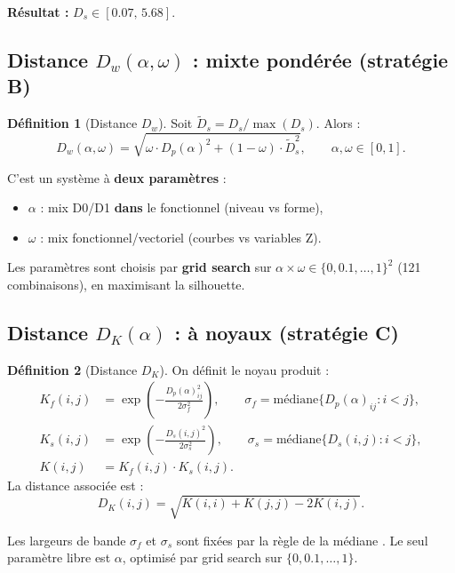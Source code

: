 \documentclass[11pt, a4paper]{article}
\newcommand{\Dp}{D_p}
\newcommand{\Dw}{D_w}
\newcommand{\DK}{D_K}
\theoremstyle{definition}
\newtheorem{definition}{Définition}[section]
\theoremstyle{remark}
\begin{document}
\textbf{Résultat :} $D_s \in [0.07, \, 5.68]$.

\subsection{Distance $\Dw(\alpha, \omega)$ : mixte pondérée (stratégie B)}

\begin{definition}[Distance $\Dw$]
Soit $\tilde{D}_s = D_s / \max(D_s)$. Alors :
\[
  \Dw(\alpha, \omega) = \sqrt{\omega \cdot \Dp(\alpha)^2 + (1-\omega) \cdot \tilde{D}_s^2},
  \qquad \alpha, \omega \in [0, 1].
\]
\end{definition}

C'est un système à \textbf{deux paramètres} :
\begin{itemize}[nosep]
  \item $\alpha$ : mix D0/D1 \textbf{dans} le fonctionnel (niveau vs forme),
  \item $\omega$ : mix fonctionnel/vectoriel (courbes vs variables Z).
\end{itemize}

Les paramètres sont choisis par \textbf{grid search} sur
$\alpha \times \omega \in \{0, 0.1, \ldots, 1\}^2$ (121 combinaisons),
en maximisant la silhouette.

\subsection{Distance $\DK(\alpha)$ : à noyaux (stratégie C)}

\begin{definition}[Distance $\DK$]
On définit le noyau produit :
\begin{align*}
  K_f(i,j) &= \exp\!\left(-\frac{\Dp(\alpha)_{ij}^2}{2\sigma_f^2}\right), \qquad
  \sigma_f = \text{médiane}\{\Dp(\alpha)_{ij} : i < j\}, \\
  K_s(i,j) &= \exp\!\left(-\frac{D_s(i,j)^2}{2\sigma_s^2}\right), \qquad
  \sigma_s = \text{médiane}\{D_s(i,j) : i < j\}, \\
  K(i,j) &= K_f(i,j) \cdot K_s(i,j).
\end{align*}
La distance associée est :
\[
  \DK(i,j) = \sqrt{K(i,i) + K(j,j) - 2K(i,j)}.
\]
\end{definition}

Les largeurs de bande $\sigma_f$ et $\sigma_s$ sont fixées par la règle de la
médiane \cite{jaakkola1999}. Le seul paramètre libre est $\alpha$,
optimisé par grid search sur $\{0, 0.1, \ldots, 1\}$.
\end{document}
